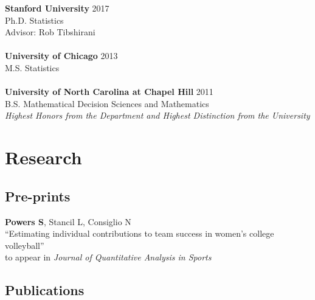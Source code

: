 \documentclass{article}
\begin{document}
{\bf Stanford University} \hfill 2017\\
Ph.D. Statistics\\
Advisor: Rob Tibshirani\\
~\\
{\bf University of Chicago} \hfill 2013\\
M.S. Statistics\\
~\\
{\bf University of North Carolina at Chapel Hill} \hfill 2011\\
B.S. Mathematical Decision Sciences and Mathematics\\
{\it Highest Honors from the Department and Highest Distinction from the University}


\section*{\sc Research}

\subsection*{\sc Pre-prints}

{\bf Powers S}, Stancil L, Consiglio N\\
``Estimating individual contributions to team success in women's college volleyball''\\
to appear in {\it Journal of Quantitative Analysis in Sports}

\subsection*{\sc Publications}
\end{document}
